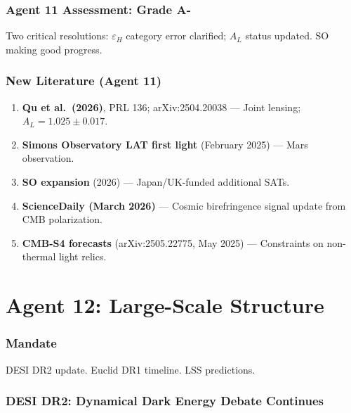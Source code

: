\documentclass[11pt,a4paper]{article}
\begin{document}
\section{Agent 11 Assessment: Grade A-}

Two critical resolutions: $\varepsilon_H$ category error clarified; $A_L$ status updated. SO making good progress.

\section{New Literature (Agent 11)}

\begin{enumerate}
\item \textbf{Qu et al.\ (2026)}, PRL 136; arXiv:2504.20038 --- Joint lensing; $A_L = 1.025 \pm 0.017$.
\item \textbf{Simons Observatory LAT first light} (February 2025) --- Mars observation.
\item \textbf{SO expansion} (2026) --- Japan/UK-funded additional SATs.
\item \textbf{ScienceDaily (March 2026)} --- Cosmic birefringence signal update from CMB polarization.
\item \textbf{CMB-S4 forecasts} (arXiv:2505.22775, May 2025) --- Constraints on non-thermal light relics.
\end{enumerate}


\part{Agent 12: Large-Scale Structure}
\label{part:agent12}

\section{Mandate}

DESI DR2 update. Euclid DR1 timeline. LSS predictions.

\section{DESI DR2: Dynamical Dark Energy Debate Continues}
\end{document}
